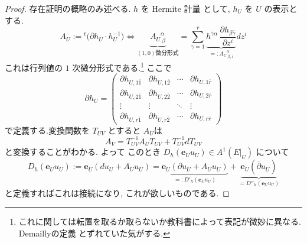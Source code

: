 \documentclass[dvipdfmx,a4paper,11pt]{article} %
\theoremstyle{definition}
\theoremstyle{remark}
\numberwithin{equation}{section}
\begin{document}
\begin{proof}
存在証明の概略のみ述べる.
\(h\) を Hermite 計量 として, \(h_U\) を \(U\) の表示とする.
\begin{equation}
A_U:={}^t\bigl(\partial h_U\cdot h_U^{-1}\bigr)
\Leftrightarrow 
\underbrace{{A_U}^\alpha_{\ \beta}}_{\text{$(1,0)$微分形式}}
=
\sum_{\gamma=1}^{r}
\underbrace{
h^{\overline\gamma\alpha}\,
\frac{\partial h_{\beta\overline\gamma}}{\partial z^i} 
}_{=: {A_U}^\alpha_{\ \beta,i}}
dz^i
\end{equation}
これは行列値の \(1\) 次微分形式である.\footnote{これに関しては転置を取るか取らないか教科書によって表記が微妙に異なる. Demaillyの定義 \cite{Dem12} とずれていた気がする.}
 ここで
\begin{equation}
\partial h_U=
\begin{pmatrix}
\partial h_{U,1\overline{1}} & \partial h_{U,1\overline{2}} & \cdots & \partial h_{U,1\overline{r}}\\
\partial h_{U,2\overline{1}} & \partial h_{U,2\overline{2}} & \cdots & \partial h_{U,2\overline{r}}\\
\vdots & \vdots & \ddots & \vdots\\
\partial h_{U,r\overline{1}} & \partial h_{U,r\overline{2}} & \cdots & \partial h_{U,r\overline{r}}
\end{pmatrix}
\end{equation}
で定義する.変換関数を \(T_{UV}\) とすると $A_U$は
\[
A_V=T_{UV}^{-1}A_U T_{UV}+T_{UV}^{-1}dT_{UV}
\]
と変換することがわかる.
よって
このとき \(D_{h}(\mathbf{e}_U u_U)\in A^1(E|_{U})\) について
\[
D_{h}(\mathbf{e}_U u_U)
:=\mathbf{e}_U (du_U + A_Uu_U)
=
\underbrace{\mathbf{e}_U (\partial u_U + A_Uu_U)}_
{=:D'_{h}(\mathbf{e}_U u_U)}
+
\underbrace{\mathbf{e}_U (\overline{\partial} u_U )}_{=D''_{h}(\mathbf{e}_U u_U)}
\]
と定義すればこれは接続になり, これが欲しいものである.
\end{proof}
\end{document}

